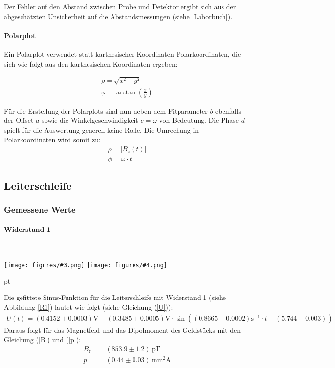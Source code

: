 \documentclass[12pt]{article}
\newcommand{\graTwoB}[5]{
	\begin{minipage}[h!]{\textwidth}
		\centering
		\texttt{[image: figures/\#3.png]}
		\texttt{[image: figures/\#4.png]}
		\captionof{figure}{#5}
	\end{minipage}
	\vskip 30 pt
}
\begin{document}
Der Fehler auf den Abstand zwischen Probe und Detektor ergibt sich aus der abgeschätzten Unsicherheit auf die Abstandsmessungen (siehe \ref{Laborbuch}).	

\paragraph{Polarplot} Ein Polarplot verwendet statt karthesischer Koordinaten Polarkoordinaten, die sich wie folgt aus den karthesischen Koordinaten ergeben:

\begin{align*}
\rho = \sqrt{x²+y²}\\
\phi = \arctan(\frac{x}{y})
\end{align*}

Für die Erstellung der Polarplots sind nun neben dem Fitparameter $b$ ebenfalls der Offset $a$ sowie die Winkelgeschwindigkeit $c = \omega$ von Bedeutung. Die Phase $d$ spielt für die Auswertung generell keine Rolle. Die Umrechung in Polarkoordinaten wird somit zu:
\begin{align*}
\rho = \left| B_z(t) \right| \\
\phi = \omega \cdot t
\end{align*}

\newpage
\subsection{Leiterschleife}
\subsubsection{Gemessene Werte }
\paragraph{Widerstand 1}\ \\
\graTwoB{0.65}{0.34}{R1_Sinusfit}{R1_polar-plot}{Widerstand R1 \label{R1}}


Die gefittete Sinus-Funktion für die Leiterschleife mit Widerstand 1 (siehe Abbildung \ref{R1}) lautet wie folgt (siehe Gleichung (\ref{U})):
\begin{align*}
	U(t)=(0.4152\pm0.0003)\mathrm V-(0.3485\pm0.0005)\mathrm V\cdot \sin((0.8665 \pm 0.0002)\mathrm{s^{-1}}\cdot t + (5.744 \pm 0.003))
\end{align*}
Daraus folgt für das Magnetfeld und das Dipolmoment des Geldstücks mit den Gleichung (\ref{B}) und (\ref{p}):
\begin{align*}
	B_z&=(853.9 \pm 1.2)\,\mathrm{pT}\\
	p&=(0.44 \pm 0.03)\,\mathrm{mm^2A}
\end{align*}
\newpage
\end{document}
